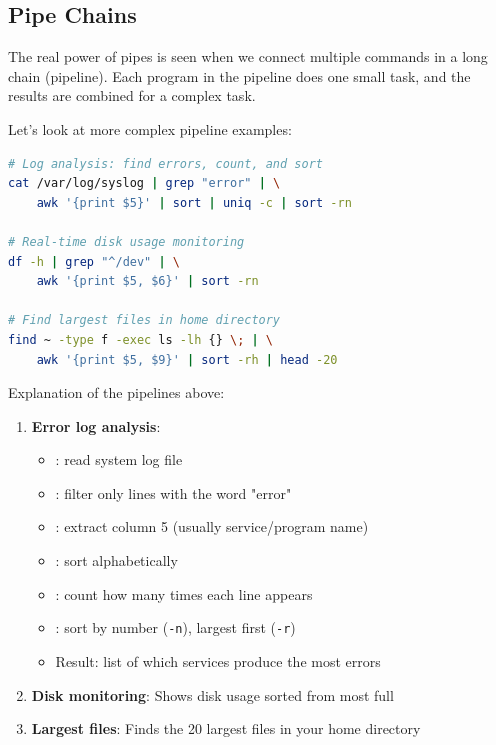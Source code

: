 \subsection{Pipe Chains}

The real power of pipes is seen when we connect multiple commands in a long chain (pipeline). Each program in the pipeline does one small task, and the results are combined for a complex task.

Let's look at more complex pipeline examples:

\begin{lstlisting}[language=bash, caption={Pipe chains (pipeline)}]
# Log analysis: find errors, count, and sort
cat /var/log/syslog | grep "error" | \
    awk '{print $5}' | sort | uniq -c | sort -rn

# Real-time disk usage monitoring
df -h | grep "^/dev" | \
    awk '{print $5, $6}' | sort -rn

# Find largest files in home directory
find ~ -type f -exec ls -lh {} \; | \
    awk '{print $5, $9}' | sort -rh | head -20
\end{lstlisting}

Explanation of the pipelines above:

\begin{enumerate}
	\item \textbf{Error log analysis}:
	      \begin{itemize}
		      \item {}: read system log file
		      \item {}: filter only lines with the word "error"
		      \item {}: extract column 5 (usually service/program name)
		      \item \cmd{sort}: sort alphabetically
		      \item \cmd{uniq -c}: count how many times each line appears
		      \item \cmd{sort -rn}: sort by number (\texttt{-n}), largest first (\texttt{-r})
		      \item Result: list of which services produce the most errors
	      \end{itemize}

	\item \textbf{Disk monitoring}: Shows disk usage sorted from most full

	\item \textbf{Largest files}: Finds the 20 largest files in your home directory
\end{enumerate}

